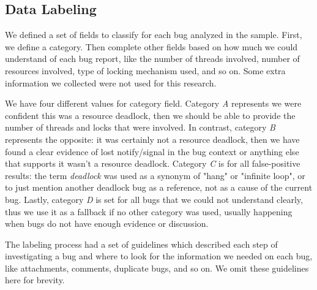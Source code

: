 \subsection{Data Labeling}

We defined a set of fields to classify for each bug analyzed in the sample. First, we define a category. Then complete other fields based on how much we could understand of each bug report, like the number of threads involved, number of resources involved, type of locking mechanism used, and so on. Some extra information we collected were not used for this research.

We have four different values for category field.
Category \emph{A} represents we were confident this was a resource deadlock, then we should be able to provide the number of threads and locks that were involved.
In contrast, category \emph{B} represents the opposite: it was certainly not a resource deadlock, then we have found a clear evidence of lost notify/signal in the bug context or anything else that supports it wasn't a resource deadlock.
Category \emph{C} is for all false-positive results: the term \emph{deadlock} was used as a synonym of "hang" or "infinite loop", or to just mention another deadlock bug as a reference, not as a cause of the current bug.
Lastly, category \emph{D} is set for all bugs that we could not understand clearly, thus we use it as a fallback if no other category was used, usually happening when bugs do not have enough evidence or discussion.


The labeling process had a set of guidelines which described each step of investigating a bug and where to look for the information we needed on each bug, like attachments, comments, duplicate bugs, and so on. We omit these guidelines here for brevity.

